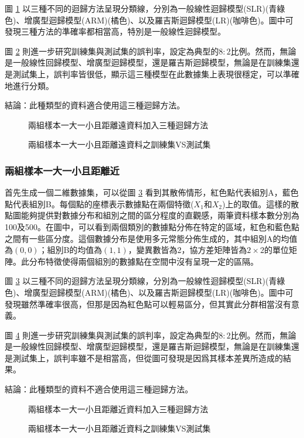 \documentclass[12pt, a4paper]{article}
\begin{document}
圖 \ref{fig:rdn3-LARline} 以三種不同的迴歸方法呈現分類線，分別為一般線性迴歸模型(SLR)(青綠色)、增廣型迴歸模型(ARM)(橘色)、以及羅吉斯迴歸模型(LR)(咖啡色)。圖中可發現三種方法的準確率都相當高，特別是一般線性迴歸模型。

圖 \ref{fig:rdn3-LARline2} 則進一步研究訓練集與測試集的誤判率，設定為典型的$8:2$比例。然而，無論是一般線性回歸模型、增廣型迴歸模型，還是羅吉斯迴歸模型，無論是在訓練集還是測試集上，誤判率皆很低，顯示這三種模型在此數據集上表現很穩定，可以準確地進行分類。

結論：此種類型的資料適合使用這三種迴歸方法。
\begin{figure}[H]
    \caption{兩組樣本一大一小且距離遠資料加入三種迴歸方法}
    \label{fig:rdn3-LARline}
\end{figure}
\begin{figure}[H]
    \caption{兩組樣本一大一小且距離遠資料之訓練集VS測試集}
    \label{fig:rdn3-LARline2}
\end{figure}

\subsubsection{兩組樣本一大一小且距離近}

首先生成一個二維數據集，可以從圖 \ref{fig:rdn4-LARline} 看到其散佈情形，紅色點代表組別A，藍色點代表組別B。每個點的座標表示數據點在兩個特徵($X_1$和$X_2$)上的取值。這樣的散點圖能夠提供對數據分布和組別之間的區分程度的直觀感，兩筆資料樣本數分別為100及500。在圖中，可以看到兩個類別的數據點分佈在特定的區域，紅色和藍色點之間有一些區分度。這個數據分布是使用多元常態分佈生成的，其中組別A的均值為$(0, 0)$；組別B的均值為$(1, 1)$，變異數皆為2，協方差矩陣皆為$2 \times 2$的單位矩陣。此分布特徵使得兩個組別的數據點在空間中沒有呈現一定的區隔。

圖 \ref{fig:rdn4-LARline} 以三種不同的迴歸方法呈現分類線，分別為一般線性迴歸模型(SLR)(青綠色)、增廣型迴歸模型(ARM)(橘色)、以及羅吉斯迴歸模型(LR)(咖啡色)。圖中可發現雖然準確率很高，但那是因為紅色點可以輕易區分，但其實此分群相當沒有意義。

圖 \ref{fig:rdn4-LARline2} 則進一步研究訓練集與測試集的誤判率，設定為典型的$8:2$比例。然而，無論是一般線性回歸模型、增廣型迴歸模型，還是羅吉斯迴歸模型，無論是在訓練集還是測試集上，誤判率雖不是相當高，但從圖可發現是因爲其樣本差異所造成的結果。

結論：此種類型的資料不適合使用這三種迴歸方法。
\begin{figure}[H]
    \caption{兩組樣本一大一小且距離近資料加入三種迴歸方法}
    \label{fig:rdn4-LARline}
\end{figure}
\begin{figure}[H]
    \caption{兩組樣本一大一小且距離近資料之訓練集VS測試集}
    \label{fig:rdn4-LARline2}
\end{figure}
\end{document}
